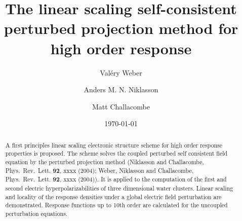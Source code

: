 \documentclass[prl,aps,twocolumn,showpacs,twocolumngrid,superbib]{revtex4}
\begin{document}

\title{The linear scaling self-consistent perturbed projection 
       method for high order response}

\author{Val\'ery Weber}
\author{Anders M. N. Niklasson}%
\author{Matt Challacombe}%

%

\date{\today}%

\begin{abstract}
A first principles linear scaling electronic structure scheme for high order 
response properties is proposed. The scheme solves the coupled perturbed self 
consistent field equation by the perturbed projection method (Niklasson and Challacombe, 
Phys.\ Rev.\ Lett. {\bf 92}, xxxx (2004); Weber, Niklasson and  Challacombe, 
Phys.\ Rev.\ Lett. {\bf 92}, xxxx (2004)).  It is applied to the computation 
of the first and second electric hyperpolarizabilities of three
dimensional water clusters. Linear scaling and locality of the response
densities under a global electric field perturbation are demonstrated. 
Response functions up to 10th order are calculated for the uncoupled perturbation 
equations.
\end{abstract}

\maketitle
\end{document}
